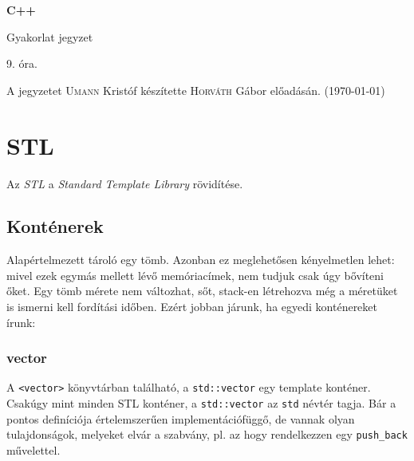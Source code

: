 \documentclass[a4paper,11.5pt]{article}
\begin{document}
	\setlength\parindent{0pt}
	\def\s{\hspace{0.2mm}\vphantom{\beta}}
	\def\Z{\mathbb{Z}}
	\def\Q{\mathbb{Q}}
	\def\R{\mathbb{R}}
	\def\C{\mathbb{C}}
	\def\N{\mathbb{N}}
	\def\Ra{\overline{\mathbb{R}}}
	
	\def\sume{\displaystyle\sum_{n=1}^{+\infty}}
	\def\sumn{\displaystyle\sum_{n=0}^{+\infty}}
	
	\def\narrow{\underset{n\rightarrow+\infty}{\longrightarrow}}
	\def\limn{\displaystyle\lim_{n\to +\infty}}
	\def\limx{\displaystyle\lim_{x\to +\infty}}
	
	\theoremstyle{definition}
	\newtheorem{theorem}{Tétel}[subsection] 
	
	\theoremstyle{definition}
	\newtheorem{definition}[theorem]{Definíció} 
	\newtheorem{example}[theorem]{Példa} 
	\newtheorem{task}[theorem]{Feladat} 
	\newtheorem{note}[theorem]{Megjegyzés}
	\begin{center}
		{\LARGE\textbf{C++}}
		
		{\Large Gyakorlat jegyzet}
		
		9. óra.
	\end{center}
	A jegyzetet \textsc{Umann} Kristóf készítette \textsc{Horváth} Gábor  előadásán. (\today)
	
	\section{STL}

	Az \textit{STL} a \textit{Standard Template Library} rövidítése.

	\subsection{Konténerek}
	Alapértelmezett tároló egy tömb. Azonban ez meglehetősen kényelmetlen lehet: mivel ezek egymás mellett lévő memóriacímek, nem tudjuk csak úgy bővíteni őket. Egy tömb mérete nem változhat, sőt, stack-en létrehozva még a méretüket is ismerni kell fordítási időben. Ezért jobban járunk, ha egyedi konténereket írunk:
	\subsubsection{vector}
	A \texttt{<vector>} könyvtárban található, a \texttt{std::vector} egy template konténer. Csakúgy mint minden STL konténer, a \texttt{std::vector} az \texttt{std} névtér tagja. Bár a pontos definíciója értelemszerűen implementációfüggő, de vannak olyan tulajdonságok, melyeket elvár a szabvány, pl. az hogy rendelkezzen egy \texttt{push\_back} művelettel.
	\smallskip
	
\end{document}
